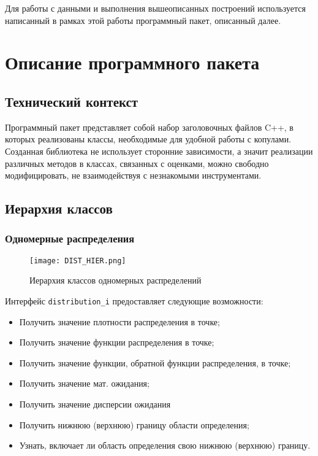 Для работы с данными и выполнения вышеописанных построений используется написанный в рамках этой работы программный пакет, описанный далее.

\section*{Описание программного пакета}
\subsection*{Технический контекст}

Программный пакет представляет собой набор заголовочных файлов C++, в которых реализованы классы, необходимые для удобной работы с копулами. Созданная библиотека не использует сторонние зависимости, а значит реализации различных методов в классах, связанных с оценками, можно свободно модифицировать, не взаимодействуя с незнакомыми инструментами.

\subsection*{Иерархия классов}

\subsubsection*{Одномерные распределения}

\begin{figure}[H]
	\centering
	\texttt{[image: DIST\_HIER.png]}
	\caption{Иерархия классов одномерных распределений}
\end{figure}

Интерфейс \texttt{distribution\_i} предоставляет следующие возможности:
\begin{itemize}
  \item Получить значение плотности распределения в точке;
  \item Получить значение функции распределения в точке;
  \item Получить значение функции, обратной функции распределения, в точке;

  \item Получить значение мат. ожидания;
  \item Получить значение дисперсии ожидания

  \item Получить нижнюю (верхнюю) границу области определения;

  \item Узнать, включает ли область определения свою нижнюю (верхнюю) границу.
\end{itemize}

